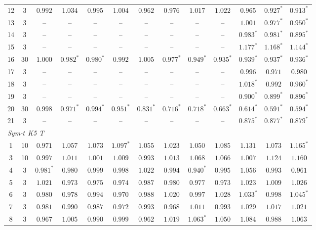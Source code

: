 \begin{table}[p]
\begin{tabular}{ccccccccccccc}
12 & 3 & $0.992$ & $1.034$ & $0.995$ & $1.004$ & $0.962$ & $0.976$ & $1.017$ & $1.022$ & $0.965$ & $0.927^{*}$ & $0.913^{*}$ \\
13 & 3 & -- & -- & -- & -- & -- & -- & -- & -- & $1.001$ & $0.977^{*}$ & $0.950^{*}$ \\
14 & 3 & -- & -- & -- & -- & -- & -- & -- & -- & $0.983^{*}$ & $0.981^{*}$ & $0.895^{*}$ \\
15 & 3 & -- & -- & -- & -- & -- & -- & -- & -- & $1.177^{*}$ & $1.168^{*}$ & $1.144^{*}$ \\
16 & 30 & $1.000$ & $0.982^{*}$ & $0.980^{*}$ & $0.992$ & $1.005$ & $0.977^{*}$ & $0.949^{*}$ & $0.935^{*}$ & $0.939^{*}$ & $0.937^{*}$ & $0.936^{*}$ \\
17 & 3 & -- & -- & -- & -- & -- & -- & -- & -- & $0.996$ & $0.971$ & $0.980$ \\
18 & 3 & -- & -- & -- & -- & -- & -- & -- & -- & $1.018^{*}$ & $0.992$ & $0.960^{*}$ \\
19 & 3 & -- & -- & -- & -- & -- & -- & -- & -- & $0.900^{*}$ & $0.899^{*}$ & $0.896^{*}$ \\
20 & 30 & $0.998$ & $0.971^{*}$ & $0.994^{*}$ & $0.951^{*}$ & $0.831^{*}$ & $0.716^{*}$ & $0.718^{*}$ & $0.663^{*}$ & $0.614^{*}$ & $0.591^{*}$ & $0.594^{*}$ \\
21 & 3 & -- & -- & -- & -- & -- & -- & -- & -- & $0.875^{*}$ & $0.877^{*}$ & $0.879^{*}$ \\
\midrule
\multicolumn{13}{l}{\emph{Sym-$t$ K5 T}} \\[1pt]
1 & 10 & $0.971$ & $1.057$ & $1.073$ & $1.097^{*}$ & $1.055$ & $1.023$ & $1.050$ & $1.085$ & $1.131$ & $1.073$ & $1.165^{*}$ \\
3 & 10 & $0.997$ & $1.011$ & $1.001$ & $1.009$ & $0.993$ & $1.013$ & $1.068$ & $1.066$ & $1.007$ & $1.124$ & $1.160$ \\
4 & 3 & $0.981^{*}$ & $0.980$ & $0.999$ & $0.998$ & $1.022$ & $0.994$ & $0.940^{*}$ & $0.995$ & $1.056$ & $0.993$ & $0.961$ \\
5 & 3 & $1.021$ & $0.973$ & $0.975$ & $0.974$ & $0.987$ & $0.980$ & $0.977$ & $0.973$ & $1.023$ & $1.009$ & $1.026$ \\
6 & 3 & $0.980$ & $0.978$ & $0.994$ & $0.970$ & $0.988$ & $1.020$ & $0.997$ & $1.028$ & $1.033^{*}$ & $0.998$ & $1.045^{*}$ \\
7 & 3 & $0.981$ & $0.990$ & $0.987$ & $0.972$ & $0.993$ & $0.968$ & $1.011$ & $0.993$ & $1.029$ & $1.017$ & $1.021$ \\
8 & 3 & $0.967$ & $1.005$ & $0.990$ & $0.999$ & $0.962$ & $1.019$ & $1.063^{*}$ & $1.050$ & $1.084$ & $0.988$ & $1.063$ \\

\end{tabular}
\end{table}
